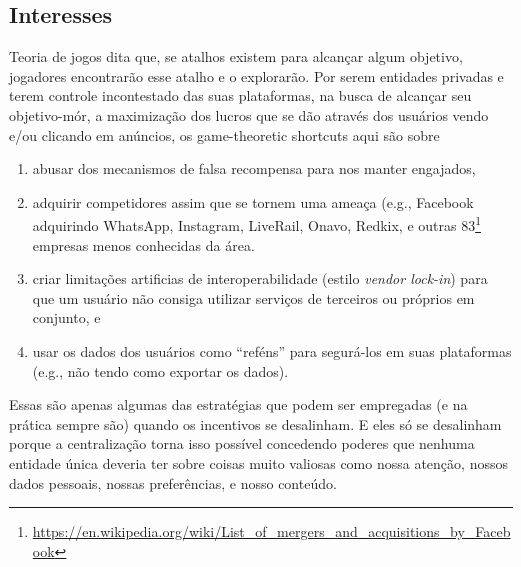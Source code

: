


\subsection{Interesses}

Teoria de jogos dita que, se atalhos existem para alcançar algum objetivo, jogadores encontrarão esse atalho e o explorarão.
Por serem entidades privadas e terem controle incontestado das suas plataformas, na busca de alcançar seu objetivo-mór, a maximização dos lucros que se dão através dos usuários vendo e/ou clicando em anúncios, os game-theoretic shortcuts aqui são sobre
\begin{enumerate}
    \item abusar dos mecanismos de falsa recompensa  para nos manter engajados,
    \item adquirir competidores assim que se tornem uma ameaça (e.g., Facebook adquirindo WhatsApp, Instagram, LiveRail, Onavo, Redkix, e outras 83\footnote{\url{https://en.wikipedia.org/wiki/List_of_mergers_and_acquisitions_by_Facebook}} empresas menos conhecidas da área.
    \item criar limitações artificias de interoperabilidade (estilo \textit{vendor lock-in}) para que um usuário não consiga utilizar serviços de terceiros ou próprios em conjunto, e
    \item usar os dados dos usuários como ``reféns'' para segurá-los em suas plataformas (e.g., não tendo como exportar os dados).
\end{enumerate}
Essas são apenas algumas das estratégias que podem ser empregadas (e na prática sempre são) quando os incentivos se desalinham.
E eles só se desalinham porque a centralização torna isso possível concedendo poderes que nenhuma entidade única deveria ter sobre coisas muito valiosas como nossa atenção, nossos dados pessoais, nossas preferências, e nosso conteúdo.

